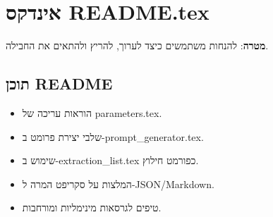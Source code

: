 \documentclass[12pt]{article}
\begin{document}
\section*{אינדקס README.tex}
\textbf{מטרה}:
להנחות משתמשים כיצד לערוך, להריץ ולהתאים את החבילה.

\subsection*{תוכן README}
\begin{itemize}
  \item הוראות עריכה של parameters.tex.
  \item שלבי יצירת פרומט ב-prompt\_generator.tex.
  \item שימוש ב-extraction\_list.tex כפורמט חילוץ.
  \item המלצות על סקריפט המרה ל-JSON/Markdown.
  \item טיפים לגרסאות מינימליות ומורחבות.
\end{itemize}
\end{document}
